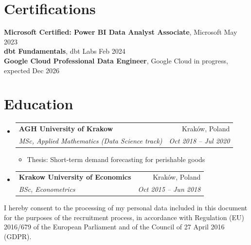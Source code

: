 \documentclass[a4paper,11pt]{article}
\makeatletter
\newcommand{\resumeItem}[1]{
  \item\small{
    {#1 \vspace{-2pt}}
  }
}
\newcommand{\resumeSubheading}[4]{
  \vspace{-2pt}\item
    \begin{tabular*}{0.97\textwidth}[t]{l@{\extracolsep{\fill}}r}
      \textbf{#1} & #2 \\
      \textit{\small#3} & \textit{\small #4} \\
    \end{tabular*}\vspace{-7pt}
}
\newcommand{\resumeSubHeadingListStart}{\begin{itemize}[leftmargin=0.15in, label={}]}
\newcommand{\resumeSubHeadingListEnd}{\end{itemize}}
\newcommand{\resumeItemListStart}{\begin{itemize}}
\newcommand{\resumeItemListEnd}{\end{itemize}\vspace{-5pt}}
\makeatother
\begin{document}
\section{Certifications}
 \begin{itemize}[leftmargin=0.15in, label={}]
    \small{\item{
     \textbf{Microsoft Certified: Power BI Data Analyst Associate}, Microsoft \hfill May 2023 \\     \textbf{dbt Fundamentals}, dbt Labs \hfill Feb 2024 \\     \textbf{Google Cloud Professional Data Engineer}, Google Cloud \hfill in progress, expected Dec 2026    }}
 \end{itemize}



\section{Education}
  \resumeSubHeadingListStart
    \resumeSubheading
      {AGH University of Krakow}{Kraków, Poland}
      {MSc, Applied Mathematics (Data Science track)}{Oct 2018 – Jul 2020}
      \resumeItemListStart
        \resumeItem{Thesis: Short-term demand forecasting for perishable goods}
      \resumeItemListEnd
    \resumeSubheading
      {Krakow University of Economics}{Kraków, Poland}
      {BSc, Econometrics}{Oct 2015 – Jun 2018}
  \resumeSubHeadingListEnd


\vfill
{\scriptsize I hereby consent to the processing of my personal data included in this document for the purposes of the recruitment process, in accordance with Regulation (EU) 2016/679 of the European Parliament and of the Council of 27 April 2016 (GDPR).\par}

\end{document}

